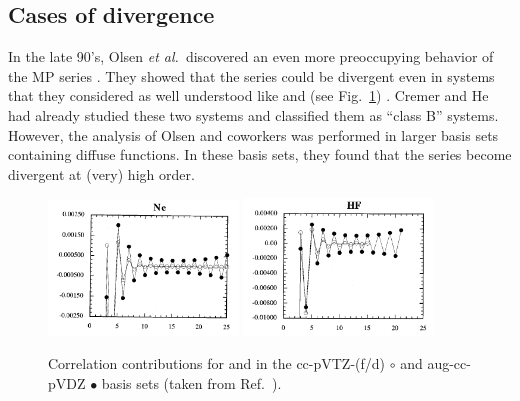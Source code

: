 \documentclass[11pt,a4paper]{article}
\begin{document}
\subsection{Cases of divergence}

In the late 90's, Olsen \textit{et al.}~discovered an even more preoccupying behavior of the MP series \cite{Olsen_1996}. They showed that the series could be divergent even in systems that they considered as well understood like  and  (see Fig.~\ref{fig:NeHFDiv}) \cite{Olsen_1996, Christiansen_1996}. Cremer and He had already studied these two systems and classified them as ``class B'' systems. However, the analysis of Olsen and coworkers was performed in larger basis sets containing diffuse functions. In these basis sets, they found that the series become divergent at (very) high order.

\begin{figure}
    \centering
    \includegraphics[width=0.45\textwidth]{Nedivergence.png}
    \includegraphics[width=0.45\textwidth]{HFdivergence.png}
    \caption{\centering Correlation contributions for  and  in the cc-pVTZ-(f/d) $\circ$ and aug-cc-pVDZ $\bullet$ basis sets (taken from Ref.~\cite{Olsen_1996}).}
    \label{fig:NeHFDiv}
\end{figure}
\end{document}

